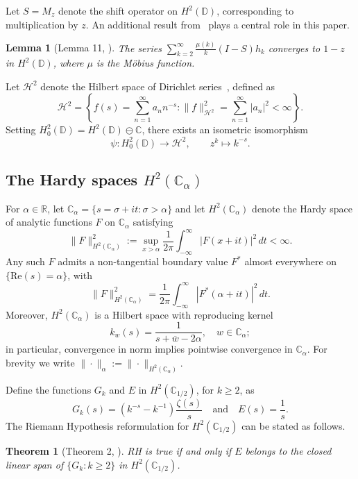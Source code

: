 \documentclass[11pt]{extarticle}
\numberwithin{equation}{section}
\theoremstyle{plain}
\newtheorem{theorem}{Theorem}[section]
\newtheorem{lemma}{Lemma}[section]
\theoremstyle{definition}
\begin{document}
Let $S = M_z$ denote the shift operator on $H^2(\mathbb{D})$, corresponding to multiplication by $z$. An additional result from~\cite{waleed1} plays a central role in this paper.

\begin{lemma}[Lemma 11, \cite{waleed1}]
\label{lem1:waleed}
The series $\sum_{k=2}^{\infty} \frac{\mu(k)}{k}(I - S)h_k$ converges to $1 - z$ in $H^2(\mathbb{D})$, where $\mu$ is the M\"{o}bius function.
\end{lemma}

Let $\mathcal{H}^2$ denote the Hilbert space of Dirichlet series~\cite{2}, defined as
\[
\mathcal{H}^2 = \left\{ f(s) = \sum_{n=1}^{\infty} a_n n^{-s} : \|f\|_{\mathcal{H}^2}^2 = \sum_{n=1}^{\infty} |a_n|^2 < \infty \right\}.
\]
Setting $H^2_0(\mathbb{D}) = H^2(\mathbb{D}) \ominus \mathbb{C}$, there exists an isometric isomorphism~\cite{2}
\[
\psi : H^2_0(\mathbb{D}) \longrightarrow \mathcal{H}^2, \qquad z^k \longmapsto k^{-s}.
\]


\subsection{The Hardy spaces $H^2(\mathbb{C}_\alpha)$}

For $\alpha \in \mathbb{R}$, let $\mathbb{C}_\alpha = \{s = \sigma + it : \sigma > \alpha\}$ and let $H^2(\mathbb{C}_\alpha)$ denote the Hardy space of analytic functions $F$ on $\mathbb{C}_\alpha$ satisfying
\[
\|F\|^2_{H^2(\mathbb{C}_\alpha)} := \sup_{x > \alpha} \frac{1}{2\pi} \int_{-\infty}^{\infty} |F(x + it)|^2 \, dt < \infty.
\]
Any such $F$ admits a non-tangential boundary value $F^*$ almost everywhere on $\{\mathrm{Re}(s) = \alpha\}$, with
\[
\|F\|^2_{H^2(\mathbb{C}_\alpha)} = \frac{1}{2\pi}\int_{-\infty}^{\infty} |F^*(\alpha + it)|^2 \, dt.
\]
Moreover, $H^2(\mathbb{C}_\alpha)$ is a Hilbert space with reproducing kernel
\[
k_w(s) = \frac{1}{s + \overline{w} - 2\alpha}, \quad w \in \mathbb{C}_\alpha;
\]
in particular, convergence in norm implies pointwise convergence in $\mathbb{C}_\alpha$. For brevity we write $\|\cdot\|_\alpha := \|\cdot\|_{H^2(\mathbb{C}_\alpha)}$.

Define the functions $G_k$ and $E$ in $H^2(\mathbb{C}_{1/2})$, for $k \geq 2$, as
\[
G_k(s) = (k^{-s} - k^{-1})\frac{\zeta(s)}{s} \quad \text{and} \quad E(s) = \frac{1}{s}.
\]
The Riemann Hypothesis reformulation for $H^2(\mathbb{C}_{1/2})$ can be stated as follows.

\begin{theorem}[Theorem 2, \cite{bagchi}]\label{thm:bagchi}
RH is true if and only if $E$ belongs to the closed linear span of $\{G_k : k \geq 2\}$ in $H^2(\mathbb{C}_{1/2})$.
\end{theorem}
\end{document}
